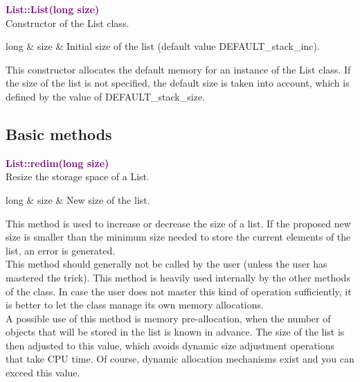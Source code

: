 \textcolor{purple}{\textbf{List::List(long size)}}\label{List::List(long size)}\\
Constructor of the List class.

\begin{tcolorbox}[width=\textwidth,myArgs,tabularx={ll|R}]
long & size & Initial size of the list (default value DEFAULT\_stack\_inc).
\end{tcolorbox}

This constructor allocates the default memory for an instance of the List class.
If the size of the list is not specified, the default size is taken into account, which is defined by the value of DEFAULT\_stack\_size.

\subsection{Basic methods}

\textcolor{purple}{\textbf{List::redim(long size)}}\label{List::redim(long size)}\\
Resize the storage space of a List.

\begin{tcolorbox}[width=\textwidth,myArgs,tabularx={ll|R}]
long & size & New size of the list.
\end{tcolorbox}

This method is used to increase or decrease the size of a list.
If the proposed new size is smaller than the minimum size needed to store the current elements of the list, an error is generated.\\
This method should generally not be called by the user (unless the user has mastered the trick).
This method is heavily used internally by the other methods of the class.
In case the user does not master this kind of operation sufficiently, it is better to let the class manage its own memory allocations.\\
A possible use of this method is memory pre-allocation, when the number of objects that will be stored in the list is known in advance.
The size of the list is then adjusted to this value, which avoids dynamic size adjustment operations that take CPU time.
Of course, dynamic allocation mechanisms exist and you can exceed this value.

